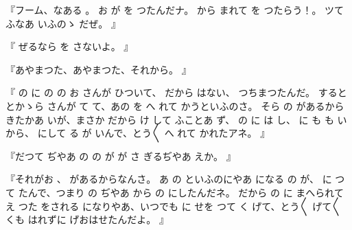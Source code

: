 『フーム、なある
。
お
が
を
つたんだナ。
から
まれて
を
つたらう！。
ツて
ふなあ
いふのゝ
だぜ。
』

『
ぜるなら
を
さないよ。
』

『あやまつた、あやまつた、それから。
』

『
の
に
の
の
お
さんが
ひついて、
だから
はない、
つちまつたんだ。
すると
とかゝら
さんが
て
て、あの
を
へ
れて
かうといふのさ。
そら
の
があるから
きたかあ
いが、まさか
だから
け
して
ふことあ
ず、
の
に
は
し、
に
も
も
いから、
にして
る
が
いんで、とう〳〵
へ
れて
かれたアネ。
』

『だつて
ぢやあ
の
の
が
が
さ
ぎるぢやあ
えか。
』

『それがお
、
があるからなんさ。
あ
の
といふのにやあ
になる
の
が、
に
つて
たんで、つまり
の
ぢやあ
から
の
にしたんだネ。
だから
の
に
まへられて
え
つた
をされる
になりやあ、いつでも
に
せを
つて
く
げて、とう〳〵
げて〳〵
くも
はれずに
げおはせたんだよ。
』

